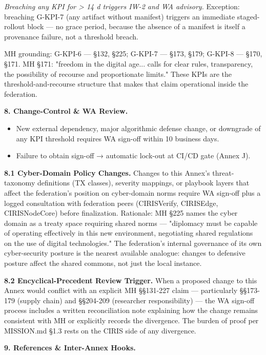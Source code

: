 \documentclass[11pt]{article}
\begin{document}
\textit{Breaching any KPI for > 14 d triggers IW-2 and WA advisory.} Exception: breaching G-KPI-7 (any artifact without manifest) triggers an immediate staged-rollout block — no grace period, because the absence of a manifest is itself a provenance failure, not a threshold breach.


MH grounding: G-KPI-6 — §132, §225; G-KPI-7 — §173, §179; G-KPI-8 — §170, §171. MH §171: "freedom in the digital age... calls for clear rules, transparency, the possibility of recourse and proportionate limits." These KPIs are the threshold-and-recourse structure that makes that claim operational inside the federation.


\textbf{8. Change-Control \& WA Review.}


\begin{itemize}\setlength\itemsep{0pt}
\item New external dependency, major algorithmic defense change, or downgrade of any KPI threshold requires WA sign-off within 10 business days.
\item Failure to obtain sign-off → automatic lock-out at CI/CD gate (Annex J).
\end{itemize}


\textbf{8.1 Cyber-Domain Policy Changes.} Changes to this Annex's threat-taxonomy definitions (TX classes), severity mappings, or playbook layers that affect the federation's position on cyber-domain norms require WA sign-off plus a logged consultation with federation peers (CIRISVerify, CIRISEdge, CIRISNodeCore) before finalization. Rationale: MH §225 names the cyber domain as a treaty space requiring shared norms — "diplomacy must be capable of operating effectively in this new environment, negotiating shared regulations on the use of digital technologies." The federation's internal governance of its own cyber-security posture is the nearest available analogue: changes to defensive posture affect the shared commons, not just the local instance.


\textbf{8.2 Encyclical-Precedent Review Trigger.} When a proposed change to this Annex would conflict with an explicit MH §§131-227 claim — particularly §§173-179 (supply chain) and §§204-209 (researcher responsibility) — the WA sign-off process includes a written reconciliation note explaining how the change remains consistent with MH or explicitly records the divergence. The burden of proof per MISSION.md §1.3 rests on the CIRIS side of any divergence.


\textbf{9. References \& Inter-Annex Hooks.}
\end{document}
